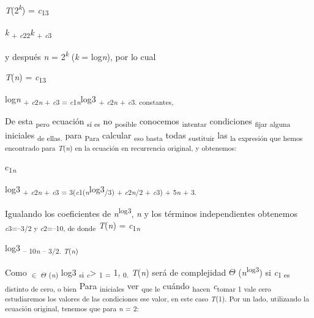 \documentclass[12pt]{article}
\renewcommand{\_}{\kern-1.5pt\textunderscore\kern-1.5pt}
\begin{document}
{\fontsize{10pt}{12.0pt}\selectfont \textit{T}(2\textit{\textsuperscript{k}}) = \textit{c}\textsubscript{13}{\fontsize{7pt}{8.4pt}\selectfont \textit{k }\textsubscript{+ \textit{c}22}\textit{k }\textsubscript{+ \textit{c}3 }{\fontsize{10pt}{12.0pt}\selectfont y después \textit{n }= 2\textit{\textsuperscript{k }}(\textit{k }= log\textit{n}), por lo cual \par}\par}\par}\par

\begin{Center}
{\fontsize{10pt}{12.0pt}\selectfont \textit{T}(\textit{n}) = \textit{c}\textsubscript{13}{\fontsize{7pt}{8.4pt}\selectfont log\textit{n }\textsubscript{+ \textit{c}2\textit{n }+ \textit{c}3 = \textit{c}1\textit{n}}log3 \textsubscript{+ \textit{c}2\textit{n }+ \textit{c}3. constantes, }{\fontsize{10pt}{12.0pt}\selectfont De esta \textsubscript{pero }ecuación \textsubscript{sí es }no \textsubscript{posible }conocemos \textsubscript{intentar }condiciones \textsubscript{fijar alguna }iniciales \textsubscript{de ellas. }para \textsubscript{Para }calcular \textsubscript{eso basta }todas \textsubscript{sustituir }las \textsubscript{la expresión que hemos encontrado para \textit{T}(\textit{n}) en la ecuación en recurrencia original, y obtenemos: }\par}\par}\par}
\end{Center}\par

{\fontsize{10pt}{12.0pt}\selectfont c\textsubscript{1\textit{n}}{\fontsize{7pt}{8.4pt}\selectfont log3 \textsubscript{+ \textit{c}2\textit{n }+ \textit{c}3 = 3(\textit{c}1(\textit{n}}log3\textsubscript{/3) + \textit{c}2\textit{n}/2 + \textit{c}3) + 5\textit{n }+ 3. }{\fontsize{10pt}{12.0pt}\selectfont Igualando los coeficientes de \textit{n}\textsuperscript{log3}, \textit{n }y los términos independientes obtenemos \textit{\textsubscript{c}}\textsubscript{3=–3/2 y \textit{c}2=–10, de donde }\textit{T}(\textit{n}) = \textit{c}\textsubscript{1\textit{n}}{\fontsize{7pt}{8.4pt}\selectfont log3 \textsubscript{– 10\textit{n }– 3/2. \textit{T}(\textit{n}) }{\fontsize{10pt}{12.0pt}\selectfont Como \textsubscript{$ \in $ $ \Theta $ (\textit{n}) }log3 \textsubscript{si \textit{c}}> \textsubscript{1 = }1, \textsubscript{0. }\textit{T}(\textit{n}) será de complejidad $ \Theta $ (\textit{n}\textsuperscript{log3}) si \textit{c}\textsubscript{1 es distinto de cero, o bien }Para \textsubscript{iniciales }ver \textsubscript{que le }cuándo \textsubscript{hacen }\textit{c}\textsubscript{tomar 1 vale cero estudiaremos los valores de las condiciones ese valor, en este caso \textit{T}(1). Por un lado, utilizando la ecuación original, tenemos que para \textit{n }= 2: }\par}\par}\par}\par}\par}\par
\end{document}
